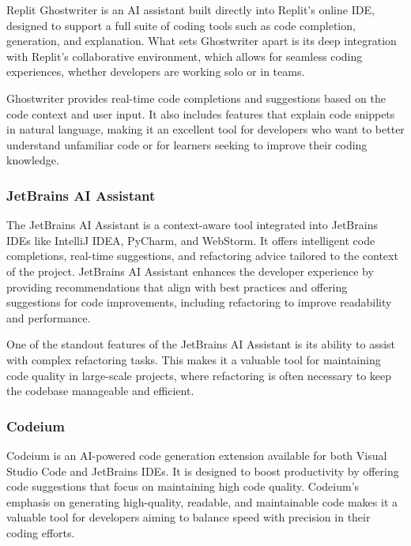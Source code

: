 Replit Ghostwriter \cite{ReplitGhostwriter} is an AI assistant built directly into Replit's online IDE, designed to support a full suite of coding tools such as code completion, generation, and explanation. What sets Ghostwriter apart is its deep integration with Replit's collaborative environment, which allows for seamless coding experiences, whether developers are working solo or in teams.

Ghostwriter provides real-time code completions and suggestions based on the code context and user input. It also includes features that explain code snippets in natural language, making it an excellent tool for developers who want to better understand unfamiliar code or for learners seeking to improve their coding knowledge.

\subsubsection{JetBrains AI Assistant}

The JetBrains AI Assistant \cite{JetBrainsAIAssistant} is a context-aware tool integrated into JetBrains IDEs like IntelliJ IDEA, PyCharm, and WebStorm. It offers intelligent code completions, real-time suggestions, and refactoring advice tailored to the context of the project. JetBrains AI Assistant enhances the developer experience by providing recommendations that align with best practices and offering suggestions for code improvements, including refactoring to improve readability and performance.

One of the standout features of the JetBrains AI Assistant is its ability to assist with complex refactoring tasks. This makes it a valuable tool for maintaining code quality in large-scale projects, where refactoring is often necessary to keep the codebase manageable and efficient.

\subsubsection{Codeium}

Codeium \cite{Codeium} is an AI-powered code generation extension available for both Visual Studio Code and JetBrains IDEs. It is designed to boost productivity by offering code suggestions that focus on maintaining high code quality. Codeium's emphasis on generating high-quality, readable, and maintainable code makes it a valuable tool for developers aiming to balance speed with precision in their coding efforts.


